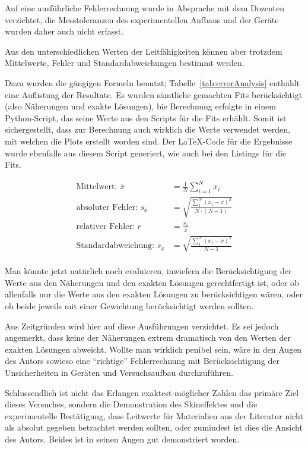 Auf eine  ausf\"uhrliche Fehlerrechnung  wurde in  Absprache mit  dem Dozenten
verzichtet, die  Messtoleranzen des  experimentellen Aufbaus und  der Ger\"ate
wurden daher auch nicht erfasst.

Aus den unterschiedlichen Werten  der Leitf\"ahigkeiten k\"onnen aber trotzdem
Mittelwerte, Fehler und Standardabweichungen bestimmt werden.

Dazu  wurden die  g\"angigen Formeln  benutzt; Tabelle~\ref{tab:errorAnalysis}
enth\"ahlt eine Auflistung der Resultate. Es wurden s\"amtliche gemachten Fits
ber\"ucksichtigt  (also N\"aherungen  und exakte  L\"osungen), bie  Berechnung
erfolgte in  einem Python-Script, das  seine Werte  aus den Scripts  f\"ur die
Fits erh\"ahlt. Somit  ist sichergestellt,  dass zur Berechnung  auch wirklich
die Werte  verwendet werden, mit  welchen die Plots erstellt  worden sind. Der
\LaTeX-Code f\"ur die Ergebnisse wurde  ebenfalls aus diesem Script generiert,
wie auch bei den Listings f\"ur die Fits.

\begin{align*}
    \text{Mittelwert:~}             \overline{x} & = \frac{1}{N} \sum_{i=1}^{N}{x_i} \\
    \text{absoluter Fehler:~}   s_{\overline{x}} & = \sqrt{ \frac{\sum_{1}^{N}{(x_i-\overline{x})^2}}{N \cdot (N-1)}} \\
    \text{relativer Fehler:~}   r                & = \frac{s_{\overline{x}}}{\overline{x}} \\
    \text{Standardabweichung:~} s_{\overline{x}} & = \sqrt{ \frac{\sum_{1}^{N}{(x_i-\overline{x})^2}}{N-1}} \\
\end{align*}



Man   k\"onnte    jetzt   nat\"urlich    noch   evaluieren,    inwiefern   die
Ber\"ucksichtigung der Werte  aus den N\"aherungen und  den exakten L\"osungen
gerechtfertigt  ist,  oder  ob  allenfalls  nur  die  Werte  aus  den  exakten
L\"osungen  zu ber\"ucksichtigen  w\"aren,  oder ob  beide  jeweils mit  einer
Gewichtung  ber\"ucksichtigt  werden   sollten.

Aus  Zeitgr\"unden  wird  hier  auf diese  Ausf\"uhrungen  verzichtet. Es  sei
jedoch  angemerkt,  dass keine  der  N\"aherungen  extrem dramatisch  von  den
Werten  der exakten  L\"osungen  abweicht. Wollte man  wirklich penibel  sein,
w\"are  in  den Augen  des  Autors  sowieso eine  ``richtige''  Fehlerrechnung
mit  Ber\"ucksichtigung der  Unsicherheiten  in  Ger\"aten und  Versuchsaufbau
durchzuf\"uhren.

Schlussendlich  ist   nicht  das  Erlangen  exaktest-m\"oglicher   Zahlen  das
prim\"are Ziel  dieses Versuches,  sondern die Demonstration  des Skineffektes
und die experimentelle Best\"atigung, dass Leitwerte f\"ur Materialien aus der
Literatur nicht als absolut gegeben  betrachtet werden sollten, oder zumindest
ist dies die  Ansicht des Autors. Beides ist in seinen  Augen gut demonstriert
worden.
